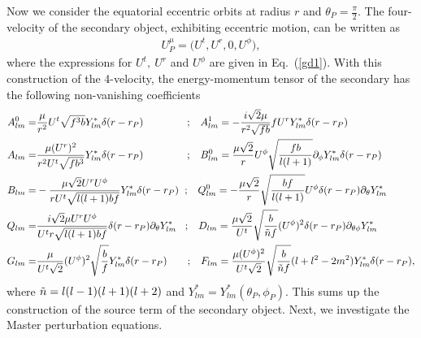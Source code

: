 \documentclass[11pt]{article}
\begin{document}
Now we consider the equatorial eccentric orbits at radius $r$ and $\theta_{P}=\frac{\pi}{2}$. The four-velocity of the secondary object, exhibiting eccentric motion, can be written as
\begin{align}
    U^{\mu}_{P} = \Big(U^{t}, U^{r}, 0, U^{\phi}\Big),
\end{align}
where the expressions for $U^{t},~ U^{r}$ and $U^{\phi}$ are given in Eq.~(\ref{gd1}). With this construction of the 4-velocity, the energy-momentum tensor of the secondary has the following non-vanishing coefficients
\begin{align} \label{dfvcxv}
A_{l m }^{0}=& \frac{\mu}{r^{2}} U^{t} \sqrt{f^{3}b} Y^{*}_{lm} \delta(r-r_{P}) \hspace{15mm} ; \hspace{3mm}
%
A^{1}_{lm} = -\frac{i\sqrt{2}\mu}{r^{2}\sqrt{fb}}fU^{r}Y^{*}_{lm}\delta(r-r_{P}) \nonumber\\
%
A_{lm} =& \frac{\mu (U^{r})^{2}}{r^{2}U^{t}\sqrt{fb^{3}}}Y^{*}_{lm}\delta(r-r_{P}) \hspace{15mm} ; \hspace{3mm}
%
B^{0}_{lm} = \frac{\mu\sqrt{2}}{r} U^{\phi} \sqrt{\frac{fb}{l(l+1)}}\partial_{\phi}Y^{*}_{lm}\delta(r-r_{P}) \nonumber \\
%
B_{lm} =& -\frac{\mu\sqrt{2}U^{r}U^{\phi}}{rU^{t}\sqrt{l(l+1)bf}} Y^{*}_{lm}\delta(r-r_{P}) \hspace{2mm} ; \hspace{3mm} 
%
Q_{lm}^{0} = -\frac{\mu\sqrt{2}}{r}\sqrt{\frac{bf}{l(l+1)}}U^{\phi}\delta(r-r_{P})\partial_{\theta}Y^{*}_{lm} \nonumber\\
%
Q_{lm} =& \frac{i\sqrt{2}\mu U^{r}U^{\phi}}{U^{t}r\sqrt{l(l+1)bf}} \delta(r-r_{P})\partial_{\theta}Y^{*}_{lm} \hspace{3mm} ; \hspace{3mm}
%
D_{lm} = \frac{\mu\sqrt{2}}{U^{t}} \sqrt{\frac{b}{\Tilde{n}f}} (U^{\phi})^{2}\delta(r-r_{P})\partial_{\theta\phi}Y^{*}_{lm} \nonumber\\
%
G_{lm} =& \frac{\mu}{U^{t}\sqrt{2}}(U^{\phi})^{2}\sqrt{\frac{b}{f}}Y^{*}_{lm} \delta(r-r_{P}) \hspace{7mm} ; \hspace{3mm}
%
F_{lm} = \frac{\mu (U^{\phi})^{2}}{U^{t}\sqrt{2}}\sqrt{\frac{b}{\Tilde{n} f}} (l+l^{2}-2m^{2})Y^{*}_{lm}\delta(r-r_{P}),
\end{align}
where $\Tilde{n} = l(l-1)(l+1)(l+2)$ and $Y^{*}_{lm} = Y^{*}_{lm}(\theta_{P}, \phi_{P})$. This sums up the construction of the source term of the secondary object. Next, we investigate the Master perturbation equations.
\end{document}
